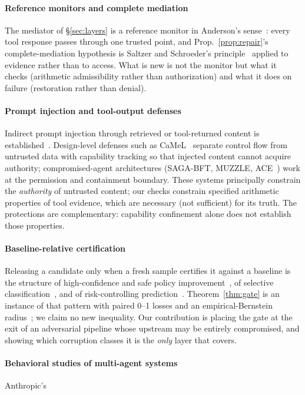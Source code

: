 \documentclass[conference]{IEEEtran}
\begin{document}
\paragraph{Reference monitors and complete mediation} The mediator of
\S\ref{sec:layers} is a reference monitor in Anderson's
sense~\cite{anderson1972}: every tool response passes through one
trusted point, and Prop.~\ref{prop:repair}'s complete-mediation
hypothesis is Saltzer and Schroeder's principle~\cite{saltzer1975}
applied to evidence rather than to access. What is new is not the
monitor but what it checks (arithmetic admissibility rather than
authorization) and what it does on failure (restoration rather than
denial). \paragraph{Prompt injection and tool-output defenses} Indirect
prompt injection through retrieved or tool-returned content is
established~\cite{greshake2023}. Design-level defenses such as
CaMeL~\cite{camel2025} separate control flow from untrusted data with
capability tracking so that injected content cannot acquire authority;
compromised-agent architectures (SAGA-BFT, MUZZLE, ACE~\cite{nds2})
work at the permission and containment boundary. These systems
principally constrain the \emph{authority} of untrusted content; our
checks constrain specified arithmetic properties of tool evidence,
which are necessary (not sufficient) for its truth. The protections
are complementary: capability confinement alone does not establish
those properties. \paragraph{Baseline-relative certification}
Releasing a candidate only when a fresh sample certifies it against a
baseline is the structure of high-confidence and safe policy
improvement~\cite{thomas2015,laroche2019}, of selective
classification~\cite{geifman2017}, and of risk-controlling
prediction~\cite{bates2021,angelopoulos2021}. Theorem~\ref{thm:gate}
is an instance of that pattern with paired 0--1 losses and an
empirical-Bernstein radius~\cite{maurerpontil2009}; we claim no new
inequality. Our contribution is placing the gate at the exit of an
adversarial pipeline whose upstream may be entirely compromised, and
showing which corruption classes it is the \emph{only} layer that
covers. \paragraph{Behavioral studies of multi-agent systems} Anthropic's
\end{document}
